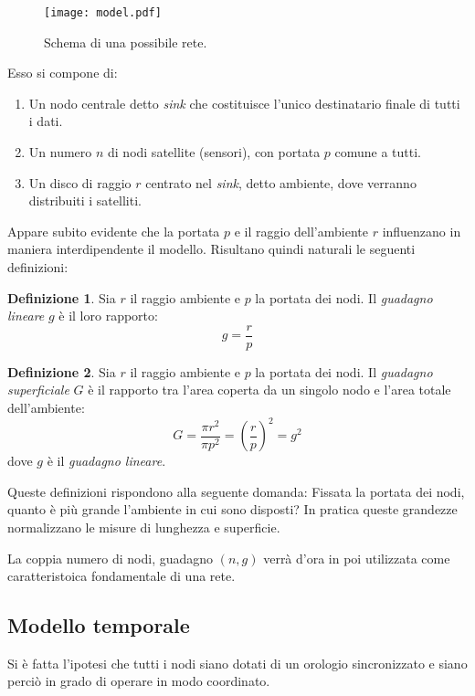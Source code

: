 \documentclass[a4paper,12pt]{article}
\theoremstyle{definition}
\newtheorem{definition}{Definizione}
\begin{document}
\begin{figure}[h]
\centering
\texttt{[image: model.pdf]}
\caption{Schema di una possibile rete.}
\end{figure}

Esso si compone di:

\begin{enumerate}
\item Un nodo centrale detto \emph{sink} che costituisce l'unico destinatario finale di tutti i dati.
\item Un numero $n$ di nodi satellite (sensori), con portata $p$ comune a tutti.
\item Un disco di raggio $r$ centrato nel \emph{sink}, detto ambiente, dove verranno distribuiti i satelliti.
\end{enumerate}

Appare subito evidente che la portata $p$ e il raggio dell'ambiente $r$ influenzano in maniera interdipendente il modello. Risultano quindi naturali le seguenti definizioni:

\begin{definition}
Sia $r$ il raggio ambiente e $p$ la portata dei nodi. Il \emph{guadagno lineare} $g$ è il loro rapporto:
$$ g = \frac{r}{p} $$
\end{definition}

\begin{definition}
Sia $r$ il raggio ambiente e $p$ la portata dei nodi. Il \emph{guadagno superficiale} $G$ è il rapporto tra l'area coperta da un singolo nodo e l'area totale dell'ambiente:
$$ G = \frac{\pi r^2}{\pi p^2} = \left(\frac{r}{p}\right)^2 = g^2 $$
dove $g$ è il \emph{guadagno lineare}.
\end{definition}

Queste definizioni rispondono alla seguente domanda: Fissata la portata dei nodi, quanto è più grande l'ambiente in cui sono disposti? In pratica queste grandezze normalizzano le misure di lunghezza e superficie. 

La coppia numero di nodi, guadagno $(n, g)$ verrà d'ora in poi utilizzata come caratteristoica fondamentale di una rete.

\subsection{Modello temporale}

Si è fatta l'ipotesi che tutti i nodi siano dotati di un orologio sincronizzato e siano perciò in grado di operare in modo coordinato.
\end{document}
